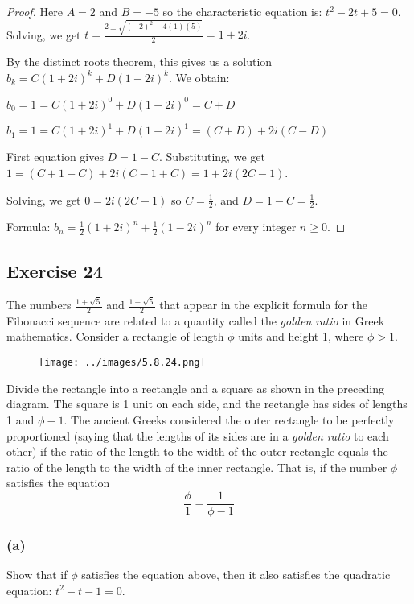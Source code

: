 \documentclass[14pt]{extarticle}
\newcommand{\dps}{\displaystyle}
\begin{document}
\begin{proof}
    Here $A = 2$ and $B = -5$ so the characteristic equation is: \(t^2 - 2t + 5 = 0\).
    Solving, we get \(\dps t = \frac{2 \pm \sqrt{(-2)^2 - 4(1)(5)}}{2} = 1 \pm 2i\).

    By the distinct roots theorem, this gives us a solution \(b_k = C(1+2i)^k + D(1-2i)^k\). We obtain:

    \(b_0 = 1 = C(1+2i)^0 + D(1-2i)^0 = C + D\)

    \(b_1 = 1 = C(1+2i)^1 + D(1-2i)^1 = (C + D) + 2i(C - D)\)

    First equation gives $D = 1 - C$. Substituting, we get \(1 = (C+1-C) + 2i(C - 1 + C) = 1 + 2i(2C-1)\).

    Solving, we get \(0 = 2i(2C-1)\) so \(C = \frac{1}{2}\),
    and \(\dps D = 1 - C = \frac{1}{2}\).

    Formula: \(\dps b_n = \frac{1}{2}(1+2i)^n + \frac{1}{2}(1-2i)^n\) for every integer \(n \geq 0\).
\end{proof}

\subsection{Exercise 24}
The numbers \(\frac{1 + \sqrt{5}}{2}\) and \(\frac{1 - \sqrt{5}}{2}\) that appear in the explicit formula for the
Fibonacci sequence are related to a quantity called the {\it golden ratio} in Greek mathematics. Consider a
rectangle of length $\phi$ units and height 1, where \(\phi > 1\).

\begin{figure}[ht!]
    \centering
    \texttt{[image: ../images/5.8.24.png]}
\end{figure}

Divide the rectangle into a rectangle and a square as shown in the preceding diagram. The square is 1 unit on each
side, and the rectangle has sides of lengths 1 and $\phi - 1$. The ancient Greeks considered the outer rectangle to be
perfectly proportioned (saying that the lengths of its sides are in a {\it golden ratio} to each other) if the
ratio of the length to the width of the outer rectangle equals the ratio of the length to the width of the inner
rectangle. That is, if the number $\phi$ satisfies the equation
\[
    \frac{\phi}{1} = \frac{1}{\phi - 1}
\]
\subsubsection{(a)}
Show that if $\phi$ satisfies the equation above, then it also satisfies the quadratic equation: \(t^2 - t - 1 = 0\).
\end{document}
